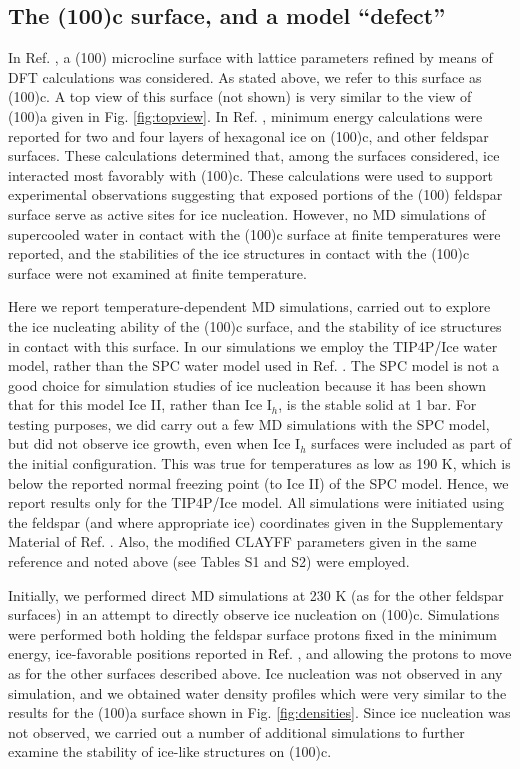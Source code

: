 \documentclass[preprint,aps,prb,floatfix]{revtex4-1}
\begin{document}
\subsection{The (100)c surface, and a model ``defect''}
\label{scipap}

In Ref. , a (100) microcline surface with lattice parameters refined by means of DFT calculations\cite{PCSM16} was considered. As stated above, we refer to this surface as (100)c. A top view of this surface (not shown) is very similar to the view of (100)a given in Fig. \ref{fig:topview}. In Ref. , minimum energy calculations were reported for two and four layers of hexagonal ice on (100)c, and other feldspar surfaces. These calculations determined that, among the surfaces considered, ice interacted most favorably with (100)c. These calculations were used to support experimental observations suggesting that exposed portions of the (100) feldspar surface serve as active sites for ice nucleation. However, no MD simulations of supercooled water in contact with the (100)c surface at finite temperatures were reported, and the stabilities of the ice structures in contact with the (100)c surface were not examined at finite temperature. 

Here we report temperature-dependent MD simulations, carried out to explore the ice nucleating ability of the (100)c surface, and the stability of ice structures in contact with this surface. In our simulations we employ the TIP4P/Ice water model, rather than the SPC water model\cite{BPGH81} used in Ref. . The SPC model is not a good choice for simulation studies of ice nucleation because it has been shown\cite{VSA05} that for this model Ice II, rather than Ice I$_{h}$, is the stable solid at 1 bar. For testing purposes, we did carry out a few MD simulations with the SPC model, but did not observe ice growth, even when Ice I$_{h}$ surfaces were included as part of the initial configuration. This was true for temperatures as low as 190 K, which is below the reported normal freezing point (to Ice II) of the SPC model.\cite{VSA05} Hence, we report results only for the TIP4P/Ice model. All simulations were initiated using the feldspar (and where appropriate ice) coordinates given in the Supplementary Material of Ref. . Also, the modified CLAYFF parameters given in the same reference and noted above (see Tables S1 and S2) were employed.

Initially, we performed direct MD simulations at 230 K (as for the other feldspar surfaces) in an attempt to directly observe ice nucleation on (100)c. Simulations were performed both holding the feldspar surface protons fixed in the minimum energy, ice-favorable positions reported in Ref. , and allowing the protons to move as for the other surfaces described above. Ice nucleation was not observed in any simulation, and we obtained water density profiles  which were very similar to the results for the (100)a surface shown in Fig. \ref{fig:densities}. Since ice nucleation was not observed, we carried out a number of additional simulations to further examine the stability of ice-like structures on (100)c. 
\end{document}
